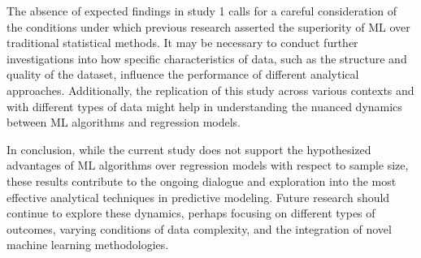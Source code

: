 \documentclass[
  man]{apa7}
\begin{document}
The absence of expected findings in study 1 calls for a careful consideration of the conditions under which previous research asserted the superiority of ML over traditional statistical methods. It may be necessary to conduct further investigations into how specific characteristics of data, such as the structure and quality of the dataset, influence the performance of different analytical approaches. Additionally, the replication of this study across various contexts and with different types of data might help in understanding the nuanced dynamics between ML algorithms and regression models.

In conclusion, while the current study does not support the hypothesized advantages of ML algorithms over regression models with respect to sample size, these results contribute to the ongoing dialogue and exploration into the most effective analytical techniques in predictive modeling. Future research should continue to explore these dynamics, perhaps focusing on different types of outcomes, varying conditions of data complexity, and the integration of novel machine learning methodologies.
\end{document}
